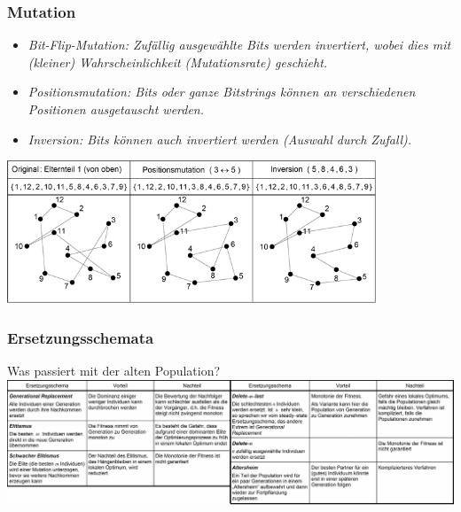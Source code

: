 \subsubsection{Mutation }
  \begin{minipage}{7.75cm}
    \begin{itemize}
      \item \em Bit-Flip-Mutation\em : Zufällig ausgewählte Bits werden invertiert, wobei dies mit (kleiner) Wahrscheinlichkeit (Mutationsrate) geschieht.
      \item \em Positionsmutation\em : Bits oder ganze Bitstrings können an verschiedenen Positionen ausgetauscht werden.
      \item \em Inversion\em : Bits können auch invertiert werden (Auswahl durch Zufall).
    \end{itemize}
  \end{minipage}
  \hfill
  \begin{minipage}{10.75cm}
    \includegraphics[width=11cm]{./Content/MetaHeuristics/GeneticAlgorithms_Mutation}
  \end{minipage}
  
  \newpage
  
\subsubsection{Ersetzungsschemata }

  Was passiert mit der alten Population?\\
  
  
  \includegraphics[width=\linewidth]{./Content/MetaHeuristics/GeneticAlgorithms_ReplacementsCroped}
   
